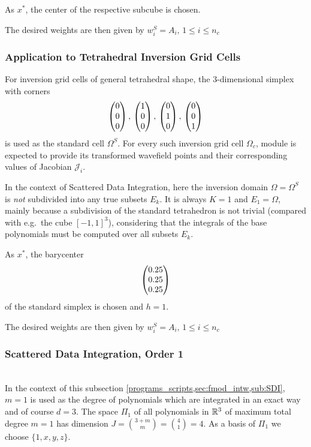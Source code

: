 As $x^\ast$, the center of the respective subcube is chosen.

The desired weights \weightsS are then given by $w^S_i = A_i,\,1\le i\le n_c$
%
\subsubsection{Application to Tetrahedral Inversion Grid Cells}
%
For inversion grid cells of general tetrahedral shape, the 3-dimensional simplex with corners
\[
\begin{pmatrix} 0 \\ 0 \\ 0 \end{pmatrix} ,\, \begin{pmatrix} 1 \\ 0 \\ 0 \end{pmatrix} ,\, \begin{pmatrix} 0 \\ 1 \\ 0 \end{pmatrix} ,\, \begin{pmatrix} 0 \\ 0 \\ 1 \end{pmatrix}
\]
is used as the standard cell $\Omega^S$. For every such inversion grid cell $\Omega_c$, module 
 is expected to provide its transformed wavefield points \wpS and their 
corresponding values of Jacobian $\mathcal{J}_i$.

In the context of Scattered Data Integration, here the inversion domain $\Omega = \Omega^S$ is \emph{not} 
subdivided into any true subsets $E_k$. It is always $K=1$ and $E_1 = \Omega$, mainly because a subdivision 
of the standard tetrahedron is not trivial (compared with e.g.\ the cube $[-1,1]^3$), considering that the integrals 
of the base polynomials must be computed over all subsets $E_k$. 

As $x^\ast$, the barycenter \[ \begin{pmatrix} 0.25 \\ 0.25 \\ 0.25 \end{pmatrix} \] of the standard simplex is chosen and $h = 1$.

The desired weights \weightsS are then given by $w^S_i = A_i,\,1\le i\le n_c$
%
\subsubsection{Scattered Data Integration, Order 1}
%
\\
In the context of this subsection \ref{programs_scripts,sec:fmod_intw,sub:SDI}, $m=1$ is used as the 
degree of polynomials which are integrated in an exact way and of course $d=3$. The space $\Pi_1$ of all polynomials in 
$\mathbb{R}^3$ of maximum total degree $m=1$ has dimension $J = \binom{3+m}{m} = \binom{4}{1} = 4$. As a basis of $\Pi_1$ we choose 
$\big\{1,\allowbreak x,\allowbreak y,\allowbreak z\big\}$.
%
